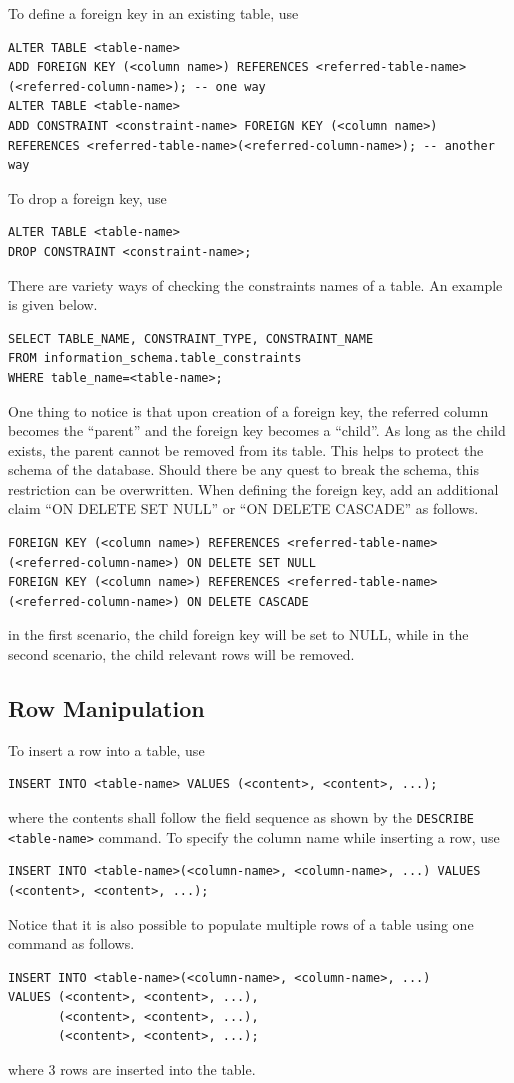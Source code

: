 To define a foreign key in an existing table, use
\begin{lstlisting}
ALTER TABLE <table-name>
ADD FOREIGN KEY (<column name>) REFERENCES <referred-table-name>(<referred-column-name>); -- one way
ALTER TABLE <table-name>
ADD CONSTRAINT <constraint-name> FOREIGN KEY (<column name>) REFERENCES <referred-table-name>(<referred-column-name>); -- another way
\end{lstlisting}
To drop a foreign key, use
\begin{lstlisting}
ALTER TABLE <table-name>
DROP CONSTRAINT <constraint-name>;
\end{lstlisting}

There are variety ways of checking the constraints names of a table. An example is given below.
\begin{lstlisting}
SELECT TABLE_NAME, CONSTRAINT_TYPE, CONSTRAINT_NAME
FROM information_schema.table_constraints
WHERE table_name=<table-name>;
\end{lstlisting}

One thing to notice is that upon creation of a foreign key, the referred column becomes the ``parent'' and the foreign key becomes a ``child''. As long as the child exists, the parent cannot be removed from its table. This helps to protect the schema of the database. Should there be any quest to break the schema, this restriction can be overwritten. When defining the foreign key, add an additional claim ``ON DELETE SET NULL'' or ``ON DELETE CASCADE'' as follows.
\begin{lstlisting}
FOREIGN KEY (<column name>) REFERENCES <referred-table-name>(<referred-column-name>) ON DELETE SET NULL
FOREIGN KEY (<column name>) REFERENCES <referred-table-name>(<referred-column-name>) ON DELETE CASCADE
\end{lstlisting}
in the first scenario, the child foreign key will be set to NULL, while in the second scenario, the child relevant rows will be removed.

\subsection{Row Manipulation}

To insert a row into a table, use
\begin{lstlisting}
INSERT INTO <table-name> VALUES (<content>, <content>, ...);
\end{lstlisting}
where the contents shall follow the field sequence as shown by the \verb|DESCRIBE <table-name>| command. To specify the column name while inserting a row, use
\begin{lstlisting}
INSERT INTO <table-name>(<column-name>, <column-name>, ...) VALUES (<content>, <content>, ...);
\end{lstlisting}
Notice that it is also possible to populate multiple rows of a table using one command as follows.
\begin{lstlisting}
INSERT INTO <table-name>(<column-name>, <column-name>, ...)
VALUES (<content>, <content>, ...),
       (<content>, <content>, ...),
       (<content>, <content>, ...);
\end{lstlisting}
where 3 rows are inserted into the table.

